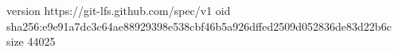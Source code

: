 version https://git-lfs.github.com/spec/v1
oid sha256:e9e91a7dc3c64ae88929398e538cbf46b5a926dffed2509d052836de83d22b6c
size 44025
